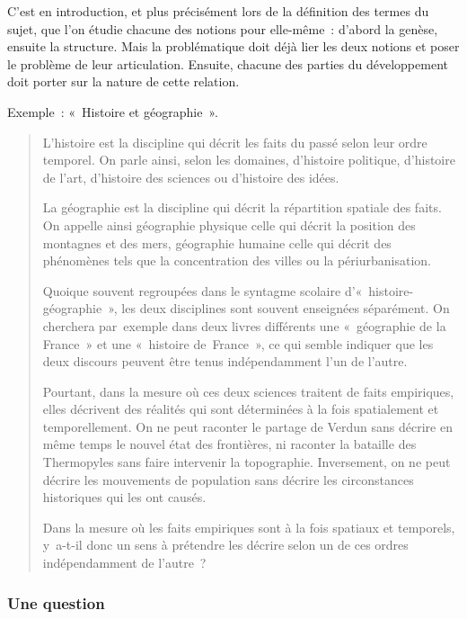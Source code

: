 \documentclass[a4paper,12pt]{article}
\begin{document}
C'est en introduction, et plus précisément lors de la définition des
termes du sujet, que l'on étudie chacune des notions pour elle-même :
d'abord la genèse, ensuite la structure. Mais la problématique doit déjà
lier les deux notions et poser le problème de leur articulation.
Ensuite, chacune des parties du développement doit porter sur la nature
de cette relation.

Exemple : « Histoire et géographie ».
\begin{quotation}
L'histoire est la discipline qui décrit les faits
du passé selon leur ordre temporel. On parle ainsi, selon les domaines,
d'histoire politique, d'histoire de l'art, d'histoire des sciences ou
d'histoire des idées.

La géographie est la discipline qui décrit la répartition spatiale des
faits. On appelle ainsi géographie physique celle qui décrit la position
des montagnes et des mers, géographie humaine celle qui décrit des
phénomènes tels que la concentration des villes ou la périurbanisation.

Quoique souvent regroupées dans le syntagme
scolaire d'« his\-toire-géographie », les deux disciplines sont souvent
enseignées séparément. On cherchera par exemple dans deux livres
différents une « géographie de la France » et une « histoire
de France », ce qui semble indiquer que les deux discours peuvent être
tenus indépendamment l'un de l'autre.

Pourtant, dans la mesure où ces deux sciences
traitent de faits empiriques, elles décrivent des réalités qui sont
déterminées à la fois spatialement et temporellement. On ne peut
raconter le partage de Verdun sans décrire en même temps le nouvel état
des frontières, ni raconter la bataille des Thermopyles sans faire
intervenir la topographie. Inversement, on ne peut décrire les
mouvements de population sans décrire les circonstances historiques qui
les ont causés.

Dans la mesure où les faits empiriques sont à
la fois spatiaux et temporels, y a-t-il donc un sens à prétendre les
décrire selon un de ces ordres indépendamment de l'autre ?
\end{quotation}

\subsubsection{Une question}
\label{sec-2-5-3}
\end{document}
